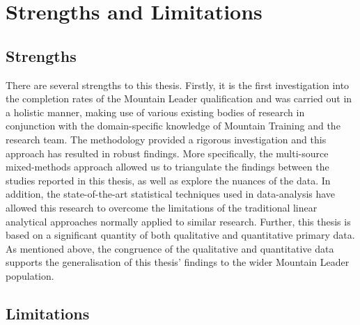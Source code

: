 \documentclass[
  12pt,
  a4paper,
]{book}
\begin{document}
\hypertarget{general-discussion-strenghts-limitations}{%
\section{Strengths and Limitations}\label{general-discussion-strenghts-limitations}}

\hypertarget{general-discussion-strengths}{%
\subsection{Strengths}\label{general-discussion-strengths}}

There are several strengths to this thesis. Firstly, it is the first investigation into the completion rates of the Mountain Leader qualification and was carried out in a holistic manner, making use of various existing bodies of research in conjunction with the domain-specific knowledge of Mountain Training and the research team. The methodology provided a rigorous investigation and this approach has resulted in robust findings. More specifically, the multi-source mixed-methods approach allowed us to triangulate the findings between the studies reported in this thesis, as well as explore the nuances of the data. In addition, the state-of-the-art statistical techniques used in data-analysis have allowed this research to overcome the limitations of the traditional linear analytical approaches normally applied to similar research. Further, this thesis is based on a significant quantity of both qualitative and quantitative primary data. As mentioned above, the congruence of the qualitative and quantitative data supports the generalisation of this thesis' findings to the wider Mountain Leader population.

\hypertarget{general-discussion-limitations}{%
\subsection{Limitations}\label{general-discussion-limitations}}
\end{document}
